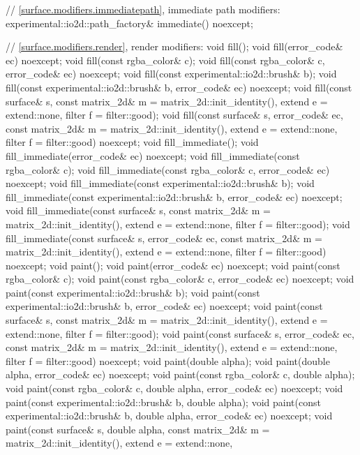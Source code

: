 \begin{codeblock}
{{{{{    // \ref{surface.modifiers.immediatepath}, immediate path modifiers:
    experimental::io2d::path_factory& immediate() noexcept;

    // \ref{surface.modifiers.render}, render modifiers:
    void fill();
    void fill(error_code& ec) noexcept;
    void fill(const rgba_color& c);
    void fill(const rgba_color& c, error_code& ec) noexcept;
    void fill(const experimental::io2d::brush& b);
    void fill(const experimental::io2d::brush& b, error_code& ec) noexcept;
    void fill(const surface& s,
      const matrix_2d& m = matrix_2d::init_identity(), extend e = extend::none,
      filter f = filter::good);
    void fill(const surface& s, error_code& ec,
      const matrix_2d& m = matrix_2d::init_identity(), extend e = extend::none, 
      filter f = filter::good) noexcept;
    void fill_immediate();
    void fill_immediate(error_code& ec) noexcept;
    void fill_immediate(const rgba_color& c);
    void fill_immediate(const rgba_color& c, error_code& ec) noexcept;
    void fill_immediate(const experimental::io2d::brush& b);
    void fill_immediate(const experimental::io2d::brush& b, error_code& ec)
      noexcept;
    void fill_immediate(const surface& s,
      const matrix_2d& m = matrix_2d::init_identity(), extend e = extend::none, 
      filter f = filter::good);
    void fill_immediate(const surface& s, error_code& ec,
      const matrix_2d& m = matrix_2d::init_identity(), extend e = extend::none, 
      filter f = filter::good) noexcept;
    void paint();
    void paint(error_code& ec) noexcept;
    void paint(const rgba_color& c);
    void paint(const rgba_color& c, error_code& ec) noexcept;
    void paint(const experimental::io2d::brush& b);
    void paint(const experimental::io2d::brush& b, error_code& ec) noexcept;
    void paint(const surface& s,
      const matrix_2d& m = matrix_2d::init_identity(), extend e = extend::none,
      filter f = filter::good);
    void paint(const surface& s, error_code& ec,
      const matrix_2d& m = matrix_2d::init_identity(), extend e = extend::none, 
      filter f = filter::good) noexcept;
    void paint(double alpha);
    void paint(double alpha, error_code& ec) noexcept;
    void paint(const rgba_color& c, double alpha);
    void paint(const rgba_color& c, double alpha, error_code& ec) noexcept;
    void paint(const experimental::io2d::brush& b, double alpha);
    void paint(const experimental::io2d::brush& b, double alpha,
      error_code& ec) noexcept;
    void paint(const surface& s, double alpha,
      const matrix_2d& m = matrix_2d::init_identity(), extend e = extend::none, 
}}}}}
\end{codeblock}
